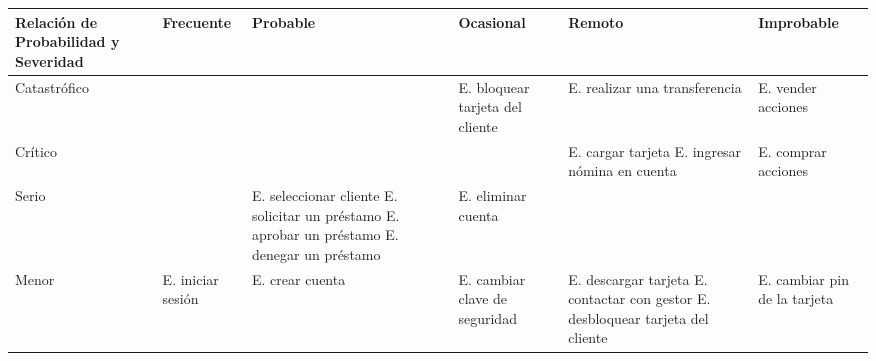 \begin{table}[H]

	\begin{adjustwidth}{-2cm}{-2cm}
		\small
		\centering
		\begin{tabularx}{1.2\textwidth}{|>{\centering}X|>{\centering}X|>{\centering}X|>{\centering}X|>{\centering}X|X|}
			\hline
			Relación de Probabilidad y Severidad & Frecuente                                         & Probable                                              & Ocasional                                             & Remoto                                               & Improbable                               \\
			\hline
			Catastrófico                         & \cellcolor{riskred}                               & \cellcolor{riskred}                                   & \cellcolor{riskred}E. bloquear tarjeta del cliente    & \cellcolor{riskyellow} E. realizar una transferencia & \cellcolor{riskgreen} E. vender acciones \\
			\hline
			Crítico                              & \cellcolor{riskred}                               & \cellcolor{riskred}                                   & \cellcolor{riskyellow}                                & \cellcolor{riskgreen} E. cargar tarjeta \newline
			E. ingresar nómina en cuenta         & \cellcolor{riskpurple}E. comprar acciones                                                                                                                                                                                                                           \\
			\hline
			Serio                                & \cellcolor{riskyellow}                            & \cellcolor{riskyellow} E. seleccionar cliente\newline
			E. solicitar un préstamo\newline
			E. aprobar un préstamo\newline
			E. denegar un préstamo\newline       & \cellcolor{riskgreen} E. eliminar cuenta          & \cellcolor{riskpurple}                                & \cellcolor{riskblue}                                                                                                                                    \\
			\hline
			Menor                                & \cellcolor{riskgreen} E. iniciar sesión           & \cellcolor{riskgreen}E. crear cuenta                  & \cellcolor{riskpurple}E. cambiar clave de seguridad   & \cellcolor{riskblue} E. descargar tarjeta\newline
			E. contactar con gestor\newline
			E. desbloquear tarjeta del cliente   & \cellcolor{riskblue} E. cambiar pin de la tarjeta                                                                                                                                                                                                                   \\
			\hline


\end{tabularx}
\end{adjustwidth}
\end{table}
